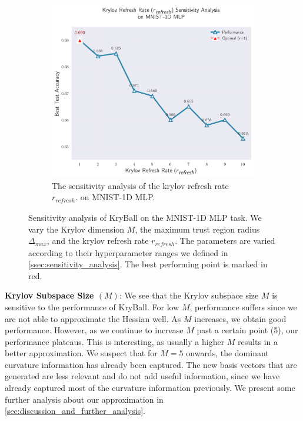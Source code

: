 \begin{figure}[!t]
\begin{subfigure}[b]{0.49\linewidth}
        \includegraphics[width=\linewidth]{figures/5evals/sens_refresh.png}
        \caption{The sensitivity analysis of the krylov refresh rate $r_{\mathit{refresh}}$. on MNIST-1D MLP.}
        \label{fig:sens_r_refresh}
    \end{subfigure}
    \caption{Sensitivity analysis of KryBall on the MNIST-1D MLP task. We vary the Krylov dimension $M$, the maximum trust region radius $\Delta_{\mathit{max}}$, and the krylov refresh rate $r_{\mathit{refresh}}$. The parameters are varied according to their hyperparameter ranges we defined in \cref{ssec:sensitivity_analysis}. The best performing point is marked in red.}
    \label{fig:sensitivity_analysis}
\end{figure}

\textbf{Krylov Subspace Size $(M)$}: We see that the Krylov subspace size $M$ is sensitive to the performance of KryBall. For low $M$, performance suffers since we are not able to approximate the Hessian well. As $M$ increases, we obtain good performance. However, as we continue to increase $M$ past a certain point (5), our performance plateaus. This is interesting, as usually a higher $M$ results in a better approximation. We suspect that for $M=5$ onwards, the dominant curvature information has already been captured. The new basis vectors that are generated are less relevant and do not add useful information, since we have already captured most of the curvature information previously. We present some further analysis about our approximation in \cref{sec:discussion_and_further_analysis}.
 
